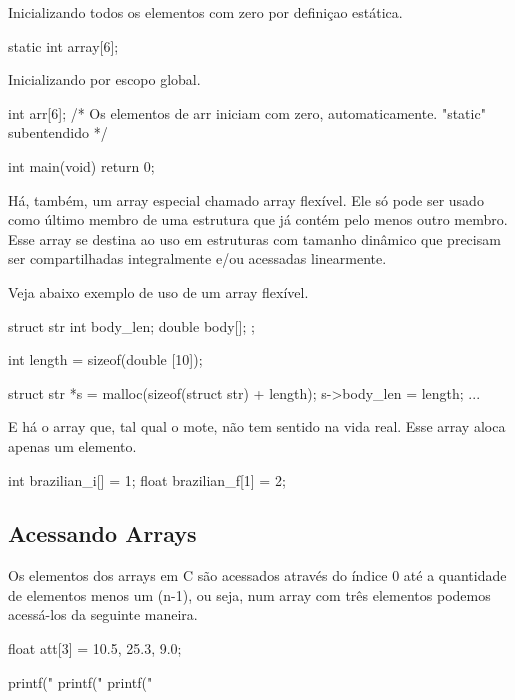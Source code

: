 Inicializando todos os elementos com zero por definiçao estática.

\begin{ccode}
  static int array[6];
\end{ccode}

Inicializando por escopo global.

\begin{ccode}
  int arr[6];  /* Os elementos de arr iniciam
                  com zero, automaticamente.
                  "static" subentendido */

  int main(void)
  {
    return 0;
  }
\end{ccode}

Há, também, um array especial chamado array flexível. Ele só pode ser usado como último membro de uma estrutura que já contém pelo menos outro membro. Esse array se destina ao uso em estruturas com tamanho dinâmico que precisam ser compartilhadas integralmente e/ou acessadas linearmente.

Veja abaixo exemplo de uso de um array flexível.

\begin{ccode}
  struct str {
      int body_len;
      double body[];
  };

  int length = sizeof(double [10]);

  struct str *s = malloc(sizeof(struct str) + length);
  s->body_len = length;
  ...
\end{ccode}

E há o array  que, tal qual o mote, não tem sentido na vida real. Esse array aloca apenas um elemento.

\begin{ccode}
  int brazilian_i[] = {1};
  float brazilian_f[1] = {2};
\end{ccode}

\subsection{Acessando Arrays}
Os elementos dos arrays em C são acessados através do índice 0 até a quantidade de elementos menos um (n-1), ou seja, num array com três elementos podemos acessá-los da seguinte maneira.

\begin{ccode}
  float att[3] = {10.5, 25.3, 9.0};

  printf("%
  printf("%
  printf("%
\end{ccode}

